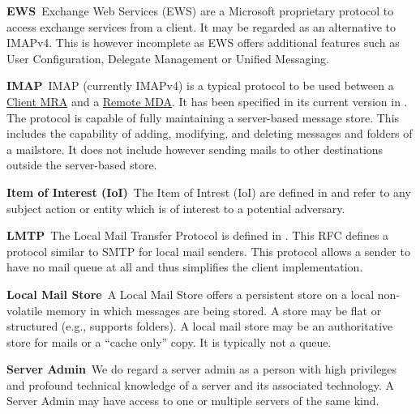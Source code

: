 \documentclass[a4paper,appendixprefix,pdfusetitle,twocolumn,fontsize=8pt,draft,DIV=calc,8pt]{\doctype} %
\newenvironment{entry}{\par\leavevmode\hangpara{1.5mm}{1}\ignorespaces}{\RaggedRight\par}
\newcommand*{\mainentry}[2]{{\bfseries{#1\label{def:#1}}}~#2\par}
\newcommand*{\defref}[1]{\hyperref[def:#1]{#1}}
\begin{document}
\begin{entry}
	\mainentry{EWS}{Exchange Web Services (EWS) are a Microsoft proprietary protocol to access exchange services from a client. It may be regarded as an alternative to IMAPv4. This is however incomplete as EWS offers additional features such as User Configuration, Delegate Management or Unified Messaging.}
\end{entry}

\begin{entry}
	\mainentry{IMAP}{IMAP (currently IMAPv4) is a typical protocol to be used between a \defref{Client MRA} and a \defref{Remote MDA}. It has been specified in its current version in \cite{RFC3501}. The protocol is capable of fully maintaining a server-based message store. This includes the capability of adding, modifying, and deleting messages and folders of a mailstore. It does not include however sending mails to other destinations outside the server-based store.}
\end{entry}

\begin{entry}
	\mainentry{Item of Interest (IoI)}{The Item of Intrest (IoI) are defined in \cite{anonTerminology} and refer to any subject action or entity which is of interest to a potential adversary.}
\end{entry}

\begin{entry}
	\mainentry{LMTP}{The Local Mail Transfer Protocol is defined in \cite{RFC2033}. This RFC defines a protocol similar to SMTP for local mail senders. This protocol allows a sender to have no mail queue at all and thus simplifies the client implementation.}
\end{entry}

\begin{entry}
	\mainentry{Local Mail Store}{A Local Mail Store offers a persistent store on a local non-volatile memory in which messages are being stored. A store may be flat or structured (e.g., supports folders). A local mail store may be an authoritative store for mails or a ``cache only'' copy. It is typically not a queue.}
\end{entry}

\begin{entry}
	\mainentry{Server Admin}{We do regard a server admin as a person with high privileges and profound technical knowledge of a server and its associated technology. A Server Admin may have access to one or multiple servers of the same kind.}
\end{entry}
\end{document}
